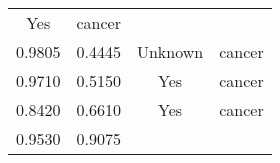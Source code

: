 \documentclass[12pt,]{article}
\begin{document}
\begin{longtable}[]{@{}cccc@{}}
\begin{minipage}[t]{0.22\columnwidth}
Yes\strut
\end{minipage} & \begin{minipage}[t]{0.16\columnwidth}\centering\strut
cancer\strut
\end{minipage}\tabularnewline
\begin{minipage}[t]{0.24\columnwidth}\centering\strut
0.9805\strut
\end{minipage} & \begin{minipage}[t]{0.26\columnwidth}\centering\strut
0.4445\strut
\end{minipage} & \begin{minipage}[t]{0.22\columnwidth}\centering\strut
Unknown\strut
\end{minipage} & \begin{minipage}[t]{0.16\columnwidth}\centering\strut
cancer\strut
\end{minipage}\tabularnewline
\begin{minipage}[t]{0.24\columnwidth}\centering\strut
0.9710\strut
\end{minipage} & \begin{minipage}[t]{0.26\columnwidth}\centering\strut
0.5150\strut
\end{minipage} & \begin{minipage}[t]{0.22\columnwidth}\centering\strut
Yes\strut
\end{minipage} & \begin{minipage}[t]{0.16\columnwidth}\centering\strut
cancer\strut
\end{minipage}\tabularnewline
\begin{minipage}[t]{0.24\columnwidth}\centering\strut
0.8420\strut
\end{minipage} & \begin{minipage}[t]{0.26\columnwidth}\centering\strut
0.6610\strut
\end{minipage} & \begin{minipage}[t]{0.22\columnwidth}\centering\strut
Yes\strut
\end{minipage} & \begin{minipage}[t]{0.16\columnwidth}\centering\strut
cancer\strut
\end{minipage}\tabularnewline
\begin{minipage}[t]{0.24\columnwidth}\centering\strut
0.9530\strut
\end{minipage} & \begin{minipage}[t]{0.26\columnwidth}\centering\strut
0.9075\strut
\end{minipage} & \begin{minipage}[t]{0.22\columnwidth}\centering\strut

\end{minipage}
\end{longtable}
\end{document}
